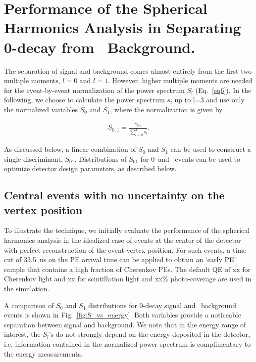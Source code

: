 \section{Performance of the Spherical Harmonics Analysis in Separating 0\nbb-decay from \B~Background.}
\label{sec:performance}


The separation of signal and background comes almost entirely from the
first two multiple moments, $l=0$ and $l=1$. However, higher multiple
moments are needed for the event-by-event normalization of the power spectrum
$S_l$ (Eq.~\ref{eq6}). In the following, we choose to calculate the
power spectrum $s_l$ up to l=3 and use only the normalized variables $S_0$
and $S_1$, where the normalization is given by

\begin{eqnarray}
\label{eq7}
S_{0,1} = \frac{s_{0,1}}{\sum_{l=0}^{3} s_l}.
\end{eqnarray}

As discussed below, a linear combination of $S_0$ and $S_1$ can be
used to construct a single discriminant, $S_{01}$. 
Distributions of $S_{01}$ for 0\nbb~and \B~events can be used to optimize
detector design parameters, as described below.

\subsection{Central events with no uncertainty on the vertex position}

To illustrate the technique, we initially evaluate 
the performance of the spherical harmonics
analysis in the idealized case of events at the center of the
detector with perfect reconstruction of the event vertex
position. For such events, a time cut of 33.5~ns on the PE arrival
time can be applied to obtain an `early PE' sample that contains a
high fraction of Cherenkov PEs. The default QE of xx for Cherenkov
light and xx for scintillation light and xx\% photo-coverage are used
in the simulation.

A comparison of $S_0$ and $S_1$ distributions for 0\nbb-decay signal
and \B~background events is shown in Fig.~\ref{fig:S_vs_energy}.  Both
variables provide a noticeable separation between signal and
background. We note that in the energy range of interest, the
$S_l$'s do not strongly depend on the energy deposited in the
detector, i.e. information contained in the normalized power
spectrum is complimentary to the energy measurements. 

